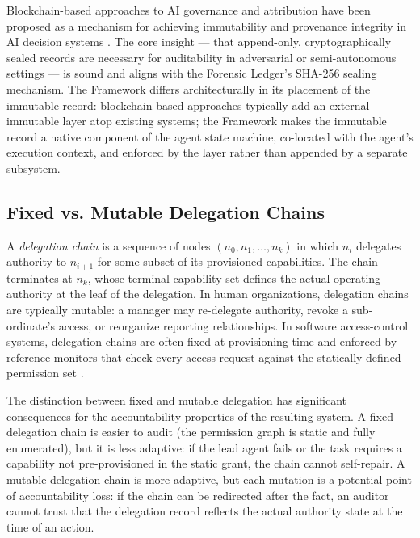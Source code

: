 Blockchain-based approaches to AI governance and attribution have been proposed as a mechanism for achieving immutability and provenance integrity in AI decision systems \cite{flexblok-blockchain, medium-accountability}. The core insight — that append-only, cryptographically sealed records are necessary for auditability in adversarial or semi-autonomous settings — is sound and aligns with the \bxthree{} Forensic Ledger's SHA-256 sealing mechanism. The \bxthree{} Framework differs architecturally in its placement of the immutable record: blockchain-based approaches typically add an external immutable layer atop existing systems; the \bxthree{} Framework makes the immutable record a native component of the agent state machine, co-located with the agent's execution context, and enforced by the \fact{} layer rather than appended by a separate subsystem.

\subsection{Fixed vs. Mutable Delegation Chains}
\label{sec:delegation-chains}

A \emph{delegation chain} is a sequence of nodes $(n_0, n_1, \dots, n_k)$ in which $n_i$ delegates authority to $n_{i+1}$ for some subset of its provisioned capabilities. The chain terminates at $n_k$, whose terminal capability set defines the actual operating authority at the leaf of the delegation. In human organizations, delegation chains are typically mutable: a manager may re-delegate authority, revoke a sub-ordinate's access, or reorganize reporting relationships. In software access-control systems, delegation chains are often fixed at provisioning time and enforced by reference monitors that check every access request against the statically defined permission set \cite{csa-delegation}.

The distinction between fixed and mutable delegation has significant consequences for the accountability properties of the resulting system. A fixed delegation chain is easier to audit (the permission graph is static and fully enumerated), but it is less adaptive: if the lead agent fails or the task requires a capability not pre-provisioned in the static grant, the chain cannot self-repair. A mutable delegation chain is more adaptive, but each mutation is a potential point of accountability loss: if the chain can be redirected after the fact, an auditor cannot trust that the delegation record reflects the actual authority state at the time of an action.

